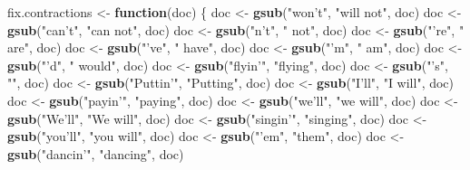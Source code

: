 \documentclass[]{article}
\newenvironment{Shaded}{\begin{snugshade}}{\end{snugshade}}
\newcommand{\ControlFlowTok}[1]{\textcolor[rgb]{0.13,0.29,0.53}{\textbf{#1}}}
\newcommand{\KeywordTok}[1]{\textcolor[rgb]{0.13,0.29,0.53}{\textbf{#1}}}
\newcommand{\NormalTok}[1]{#1}
\newcommand{\StringTok}[1]{\textcolor[rgb]{0.31,0.60,0.02}{#1}}
\begin{document}
\begin{Shaded}
\begin{Highlighting}[]
\NormalTok{fix.contractions <-}\StringTok{ }\ControlFlowTok{function}\NormalTok{(doc) \{}
\NormalTok{  doc <-}\StringTok{ }\KeywordTok{gsub}\NormalTok{(}\StringTok{"won't"}\NormalTok{, }\StringTok{"will not"}\NormalTok{, doc)}
\NormalTok{  doc <-}\StringTok{ }\KeywordTok{gsub}\NormalTok{(}\StringTok{"can't"}\NormalTok{, }\StringTok{"can not"}\NormalTok{, doc)}
\NormalTok{  doc <-}\StringTok{ }\KeywordTok{gsub}\NormalTok{(}\StringTok{"n't"}\NormalTok{, }\StringTok{" not"}\NormalTok{, doc)}
\NormalTok{  doc <-}\StringTok{ }\KeywordTok{gsub}\NormalTok{(}\StringTok{"'re"}\NormalTok{, }\StringTok{" are"}\NormalTok{, doc)}
\NormalTok{  doc <-}\StringTok{ }\KeywordTok{gsub}\NormalTok{(}\StringTok{"'ve"}\NormalTok{, }\StringTok{" have"}\NormalTok{, doc)}
\NormalTok{  doc <-}\StringTok{ }\KeywordTok{gsub}\NormalTok{(}\StringTok{"'m"}\NormalTok{, }\StringTok{" am"}\NormalTok{, doc)}
\NormalTok{  doc <-}\StringTok{ }\KeywordTok{gsub}\NormalTok{(}\StringTok{"'d"}\NormalTok{, }\StringTok{" would"}\NormalTok{, doc)}
\NormalTok{  doc <-}\StringTok{ }\KeywordTok{gsub}\NormalTok{(}\StringTok{"flyin'"}\NormalTok{, }\StringTok{"flying"}\NormalTok{, doc)}
\NormalTok{  doc <-}\StringTok{ }\KeywordTok{gsub}\NormalTok{(}\StringTok{"'s"}\NormalTok{, }\StringTok{""}\NormalTok{, doc)}
\NormalTok{  doc <-}\StringTok{ }\KeywordTok{gsub}\NormalTok{(}\StringTok{"Puttin'"}\NormalTok{, }\StringTok{"Putting"}\NormalTok{, doc)}
\NormalTok{  doc <-}\StringTok{ }\KeywordTok{gsub}\NormalTok{(}\StringTok{"I'll"}\NormalTok{, }\StringTok{"I will"}\NormalTok{, doc)}
\NormalTok{  doc <-}\StringTok{ }\KeywordTok{gsub}\NormalTok{(}\StringTok{"payin'"}\NormalTok{, }\StringTok{"paying"}\NormalTok{, doc)}
\NormalTok{  doc <-}\StringTok{ }\KeywordTok{gsub}\NormalTok{(}\StringTok{"we'll"}\NormalTok{, }\StringTok{"we will"}\NormalTok{, doc)}
\NormalTok{  doc <-}\StringTok{ }\KeywordTok{gsub}\NormalTok{(}\StringTok{"We'll"}\NormalTok{, }\StringTok{"We will"}\NormalTok{, doc)}
\NormalTok{  doc <-}\StringTok{ }\KeywordTok{gsub}\NormalTok{(}\StringTok{"singin'"}\NormalTok{, }\StringTok{"singing"}\NormalTok{, doc)}
\NormalTok{  doc <-}\StringTok{ }\KeywordTok{gsub}\NormalTok{(}\StringTok{"you'll"}\NormalTok{, }\StringTok{"you will"}\NormalTok{, doc)}
\NormalTok{  doc <-}\StringTok{ }\KeywordTok{gsub}\NormalTok{(}\StringTok{"'em"}\NormalTok{, }\StringTok{"them"}\NormalTok{, doc)}
\NormalTok{  doc <-}\StringTok{ }\KeywordTok{gsub}\NormalTok{(}\StringTok{"dancin'"}\NormalTok{, }\StringTok{"dancing"}\NormalTok{, doc)}

\end{Highlighting}
\end{Shaded}
\end{document}
